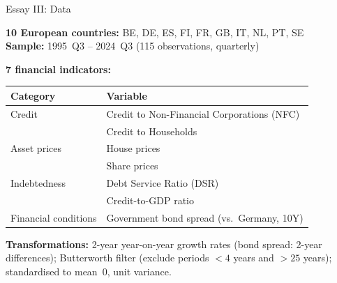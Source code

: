 \documentclass{beamer}
\begin{document}
\begin{frame}{Essay III: Data}

\textbf{10 European countries:} BE, DE, ES, FI, FR, GB, IT, NL, PT, SE\\
\textbf{Sample:} 1995~Q3 -- 2024~Q3 (115 observations, quarterly)

\vspace{0.5em}
\textbf{7 financial indicators:}
{\small
\begin{tabular}{ll}
\toprule
\textbf{Category} & \textbf{Variable} \\
\midrule
Credit & Credit to Non-Financial Corporations (NFC) \\
 & Credit to Households \\
Asset prices & House prices \\
 & Share prices \\
Indebtedness & Debt Service Ratio (DSR) \\
 & Credit-to-GDP ratio \\
Financial conditions & Government bond spread (vs.\ Germany, 10Y) \\
\bottomrule
\end{tabular}
}

\vspace{0.4em}
\textbf{Transformations:} 2-year year-on-year growth rates (bond spread: 2-year differences); Butterworth filter (exclude periods $<4$ years and $>25$ years); standardised to mean~0, unit variance.

\end{frame}
\end{document}

